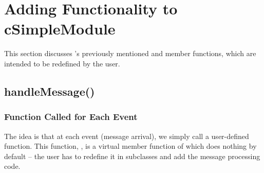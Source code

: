 %
%


\section{Adding Functionality to cSimpleModule}
\label{sec:simple-modules:handlemessage-and-activity}

This section discusses 's previously mentioned
 and  member functions, which are
intended to be redefined by the user.


\subsection{handleMessage()}
\label{sec:simple-modules:handlemessage}

\subsubsection{Function Called for Each Event}
\label{sec:simple-modules:handlemessage:overview}

The idea is that at each event (message arrival), we
simply call a user-defined function. This function,
, is a
virtual member function of  which does
nothing by default -- the user has to redefine it in subclasses
and add the message processing code.

